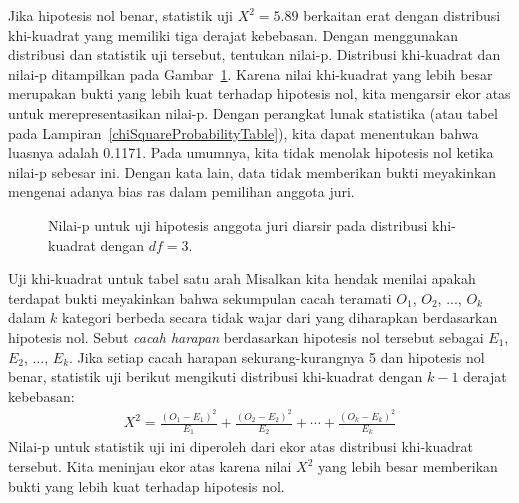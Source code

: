 \begin{examplewrap}
\begin{nexample}{Jika hipotesis nol benar,
    statistik uji $X^2=5.89$ berkaitan erat
    dengan distribusi khi-kuadrat yang memiliki
    tiga derajat kebebasan.
    Dengan menggunakan distribusi dan statistik uji tersebut,
    tentukan nilai-p.}
  Distribusi khi-kuadrat dan nilai-p ditampilkan pada
  Gambar~\ref{jurorHTPValueShown}.
  Karena nilai khi-kuadrat yang lebih besar merupakan bukti yang lebih kuat
  terhadap hipotesis nol, kita mengarsir ekor atas
  untuk merepresentasikan nilai-p.
  Dengan perangkat lunak statistika (atau tabel pada
  Lampiran~\ref{chiSquareProbabilityTable}),
  kita dapat menentukan bahwa luasnya adalah 0.1171.
  Pada umumnya, kita tidak menolak hipotesis nol
  ketika nilai-p sebesar ini.
  Dengan kata lain, data tidak memberikan bukti meyakinkan
  mengenai adanya bias ras dalam pemilihan anggota juri.
\end{nexample}
\end{examplewrap}

\begin{figure}[h]
\centering
{}
\caption{Nilai-p untuk uji hipotesis anggota juri diarsir pada distribusi khi-kuadrat dengan $df=3$.}
\label{jurorHTPValueShown}
\end{figure}


\begin{onebox}{Uji khi-kuadrat untuk tabel satu arah}
  Misalkan kita hendak menilai apakah terdapat bukti meyakinkan
  bahwa sekumpulan cacah teramati $O_1$, $O_2$, ...,
  $O_k$ dalam $k$ kategori berbeda secara tidak wajar dari yang
  diharapkan berdasarkan hipotesis nol.
  Sebut \emph{cacah harapan} berdasarkan hipotesis nol tersebut
  sebagai $E_1$, $E_2$, ..., $E_k$.
  Jika setiap cacah harapan sekurang-kurangnya 5 dan hipotesis nol
  benar, statistik uji berikut mengikuti distribusi khi-kuadrat
  dengan $k-1$ derajat kebebasan:
  \begin{align*}
  X^2
    = \frac{(O_1 - E_1)^2}{E_1} +
        \frac{(O_2 - E_2)^2}{E_2} +
        \cdots +
        \frac{(O_k - E_k)^2}{E_k}
  \end{align*}
  Nilai-p untuk statistik uji ini diperoleh dari ekor atas
  distribusi khi-kuadrat tersebut.
  Kita meninjau ekor atas karena nilai $X^2$ yang lebih besar
  memberikan bukti yang lebih kuat terhadap hipotesis nol.
\end{onebox}

